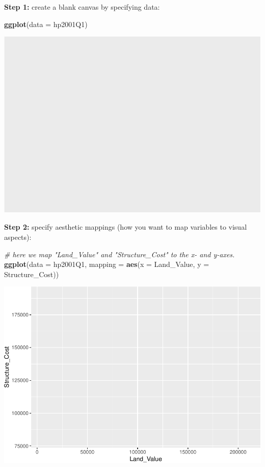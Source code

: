 \documentclass[]{book}
\newenvironment{Shaded}{\begin{snugshade}}{\end{snugshade}}
\newcommand{\CommentTok}[1]{\textcolor[rgb]{0.56,0.35,0.01}{\textit{#1}}}
\newcommand{\DataTypeTok}[1]{\textcolor[rgb]{0.13,0.29,0.53}{#1}}
\newcommand{\KeywordTok}[1]{\textcolor[rgb]{0.13,0.29,0.53}{\textbf{#1}}}
\newcommand{\NormalTok}[1]{#1}
\begin{document}
\textbf{Step 1:} create a blank canvas by specifying data:

\begin{Shaded}
\begin{Highlighting}[]
\KeywordTok{ggplot}\NormalTok{(}\DataTypeTok{data =}\NormalTok{ hp2001Q1)}
\end{Highlighting}
\end{Shaded}

\includegraphics{R/Rgraphics/figures/unnamed-chunk-142-1.pdf}

\textbf{Step 2:} specify aesthetic mappings (how you want to map variables to visual aspects):

\begin{Shaded}
\begin{Highlighting}[]
\CommentTok{# here we map "Land_Value" and "Structure_Cost" to the x- and y-axes.}
\KeywordTok{ggplot}\NormalTok{(}\DataTypeTok{data =}\NormalTok{ hp2001Q1, }\DataTypeTok{mapping =} \KeywordTok{aes}\NormalTok{(}\DataTypeTok{x =}\NormalTok{ Land_Value, }\DataTypeTok{y =}\NormalTok{ Structure_Cost))}
\end{Highlighting}
\end{Shaded}

\includegraphics{R/Rgraphics/figures/unnamed-chunk-143-1.pdf}
\end{document}
